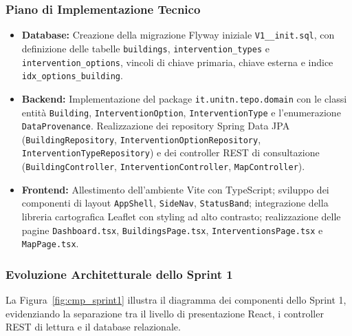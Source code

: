 \subsubsection{Piano di Implementazione Tecnico}
\begin{itemize}[leftmargin=1.4em, itemsep=0.2em]
    \item \textbf{Database:} Creazione della migrazione Flyway iniziale \texttt{V1\_\_init.sql}, con definizione delle tabelle \texttt{buildings}, \texttt{intervention\_types} e \texttt{intervention\_options}, vincoli di chiave primaria, chiave esterna e indice \texttt{idx\_options\_building}.
    \item \textbf{Backend:} Implementazione del package \texttt{it.unitn.tepo.domain} con le classi entità \texttt{Building}, \texttt{InterventionOption}, \texttt{InterventionType} e l'enumerazione \texttt{DataProvenance}. Realizzazione dei repository Spring Data JPA (\texttt{BuildingRepository}, \texttt{InterventionOptionRepository}, \texttt{InterventionTypeRepository}) e dei controller REST di consultazione (\texttt{BuildingController}, \texttt{InterventionController}, \texttt{MapController}).
    \item \textbf{Frontend:} Allestimento dell'ambiente Vite con TypeScript; sviluppo dei componenti di layout \texttt{AppShell}, \texttt{SideNav}, \texttt{StatusBand}; integrazione della libreria cartografica Leaflet con styling ad alto contrasto; realizzazione delle pagine \texttt{Dashboard.tsx}, \texttt{BuildingsPage.tsx}, \texttt{InterventionsPage.tsx} e \texttt{MapPage.tsx}.
\end{itemize}

\subsubsection{Evoluzione Architetturale dello Sprint 1}
La Figura~\ref{fig:cmp_sprint1} illustra il diagramma dei componenti dello Sprint 1, evidenziando la separazione tra il livello di presentazione React, i controller REST di lettura e il database relazionale.

